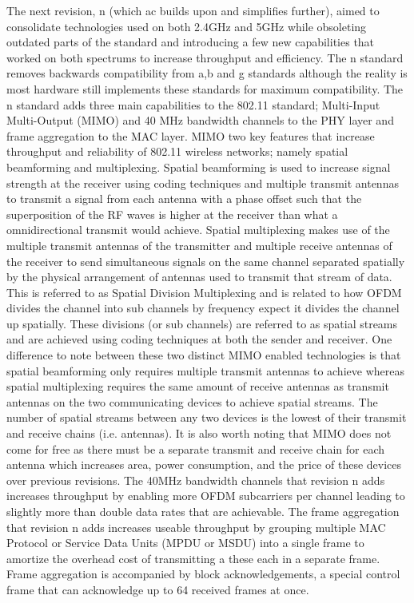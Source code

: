 The next revision, n (which ac builds upon and simplifies further), aimed to consolidate technologies used on both 2.4GHz and 5GHz while obsoleting outdated parts of the standard and introducing a few new capabilities that worked on both spectrums to increase throughput and efficiency. The n standard removes backwards compatibility from a,b and g standards although the reality is most hardware still implements these standards for maximum compatibility. The n standard adds three main capabilities to the 802.11 standard; Multi-Input Multi-Output (MIMO) and 40 MHz bandwidth channels to the PHY layer and frame aggregation to the MAC layer. MIMO two key features that increase throughput and reliability of 802.11 wireless networks; namely spatial beamforming and multiplexing. Spatial beamforming is used to increase signal strength at the receiver using coding techniques and multiple transmit antennas to transmit a signal from each antenna with a phase offset such that the superposition of the RF waves is higher at the receiver than what a omnidirectional transmit would achieve. Spatial multiplexing makes use of the multiple transmit antennas of the transmitter and multiple receive antennas of the receiver to send  simultaneous signals on the same channel separated spatially by the physical arrangement of antennas used to transmit that stream of data. This is referred to as Spatial Division Multiplexing and is related to how OFDM divides the channel into sub channels by frequency expect it divides the channel up spatially. These divisions (or sub channels) are referred to as spatial streams and are achieved using coding techniques at both the sender and receiver. One difference to note between these two distinct MIMO enabled technologies is that spatial beamforming only requires multiple transmit antennas to achieve whereas spatial multiplexing requires the same amount of receive antennas as transmit antennas on the two communicating devices to achieve spatial streams. The number of spatial streams between any two devices is the lowest of their transmit and receive chains (i.e. antennas). It is also worth noting that MIMO does not come for free as there must be a separate transmit and receive chain for each antenna which increases area, power consumption, and the price of these devices over previous revisions. The 40MHz bandwidth channels that revision n adds increases throughput by enabling more OFDM subcarriers per channel leading to slightly more than double data rates that are achievable. The frame aggregation that revision n adds increases useable throughput by grouping multiple MAC Protocol or Service Data Units (MPDU or MSDU) into a single frame to amortize the overhead cost of transmitting a these each in a separate frame. Frame aggregation is accompanied by block acknowledgements, a special control frame that can acknowledge up to 64 received frames at once. 

